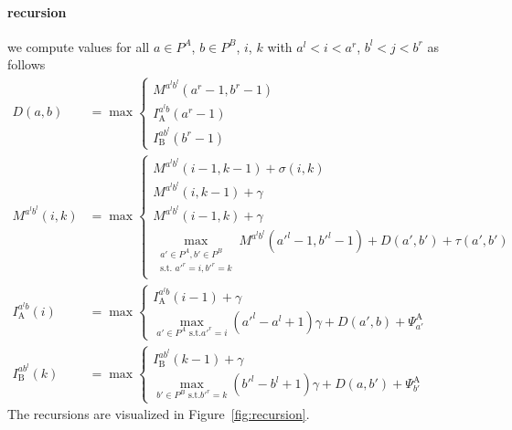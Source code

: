 \documentclass{article}
\newcommand{\DTmat}[2]{D(#1,#2)}
\newcommand{\MTmat}[4]{M^{{#1}^l {#2}^l}(#3,#4)}
\newcommand{\IATmat}[3]{I^{{#1}^l {#2}}_\textrm{A}(#3)}
\newcommand{\IBTmat}[3]{I^{{#1} {#2}^l}_\textrm{B}(#3)}
\newcommand{\PsiA}[1]{\Psi^\textrm{A}_{#1}}
\begin{document}
\paragraph{recursion}
we compute values for all $a\in P^A$, $b\in P^B$, $i$, $k$
with $a^l<i<a^r$, $b^l<j<b^r$ as follows
\begin{align}
  \DTmat{a}{b} &= \max
  \begin{cases}
    \MTmat{a}{b}{a^r-1}{b^r-1}\\
    \IATmat{a}{b}{a^r-1}\\
    \IBTmat{a}{b}{b^r-1}
  \end{cases}\label{recursionD}\\
  \MTmat{a}{b}{i}{k} &= \max
  \begin{cases}
    \MTmat{a}{b}{i-1}{k-1} + \sigma(i,k)\\
    \MTmat{a}{b}{i}{k-1} + \gamma\\
    \MTmat{a}{b}{i-1}{k} + \gamma\\
    \max_{\substack{a'\in P^A,b'\in P^B\\\text{s.t. } a'^r=i, b'^r=k}}\limits \MTmat{a}{b}{a'^l-1}{b'^l-1} + \DTmat{a'}{b'} + \tau(a',b')
  \end{cases}\label{recursionM}\\
  \IATmat{a}{b}{i} &= \max
  \begin{cases}
    \IATmat{a}{b}{i-1} + \gamma\\
    \max_{a'\in P^A\text{ s.t.} a'^r=i}\limits (a'^l-a^l+1)\gamma + \DTmat{a'}{b} +  \PsiA{a'}
  \end{cases}\label{recursionIA}\\
  \IBTmat{a}{b}{k} &= \max
  \begin{cases}
    \IBTmat{a}{b}{k-1} + \gamma\\
    \max_{b'\in P^B\text{ s.t.} b'^r=k}\limits (b'^l-b^l+1)\gamma +
    \DTmat{a}{b'} + \PsiA{b'}
  \end{cases}\label{recursionIB}
\end{align}
The recursions are visualized in Figure~\ref{fig:recursion}.
\end{document}
